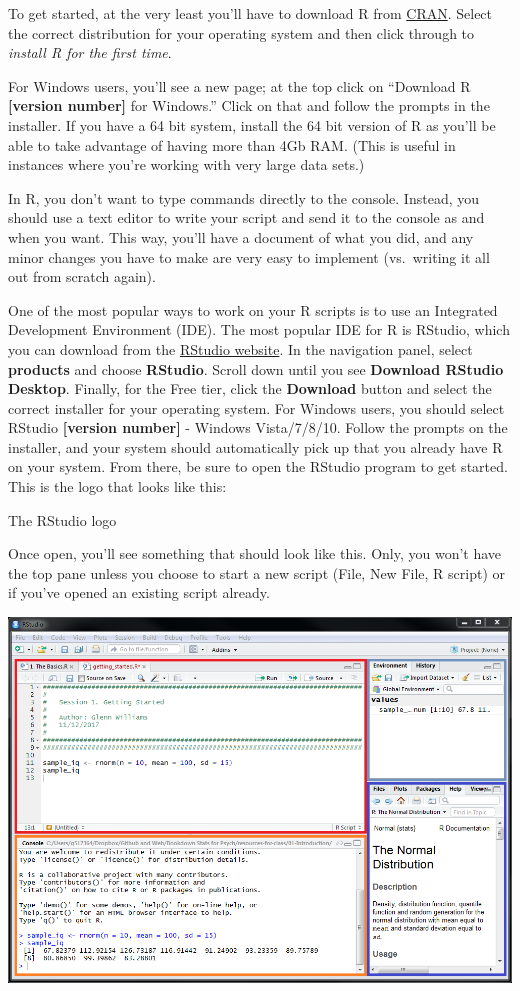 \documentclass[
]{book}
\begin{document}
To get started, at the very least you'll have to download R from \href{https://cran.r-project.org/}{CRAN}. Select the correct distribution for your operating system and then click through to \emph{install R for the first time}.

For Windows users, you'll see a new page; at the top click on ``Download R \textbf{{[}version number{]}} for Windows.'' Click on that and follow the prompts in the installer. If you have a 64 bit system, install the 64 bit version of R as you'll be able to take advantage of having more than 4Gb RAM. (This is useful in instances where you're working with very large data sets.)

In R, you don't want to type commands directly to the console. Instead, you should use a text editor to write your script and send it to the console as and when you want. This way, you'll have a document of what you did, and any minor changes you have to make are very easy to implement (vs.~writing it all out from scratch again).

One of the most popular ways to work on your R scripts is to use an Integrated Development Environment (IDE). The most popular IDE for R is RStudio, which you can download from the \href{https://www.rstudio.com/}{RStudio website}. In the navigation panel, select \textbf{products} and choose \textbf{RStudio}. Scroll down until you see \textbf{Download RStudio Desktop}. Finally, for the Free tier, click the \textbf{Download} button and select the correct installer for your operating system. For Windows users, you should select RStudio \textbf{{[}version number{]}} - Windows Vista/7/8/10. Follow the prompts on the installer, and your system should automatically pick up that you already have R on your system. From there, be sure to open the RStudio program to get started. This is the logo that looks like this:

The RStudio logo

Once open, you'll see something that should look like this. Only, you won't have the top pane unless you choose to start a new script (File, New File, R script) or if you've opened an existing script already.

\begin{center}\includegraphics[width=13.86in]{img/r_studio} \end{center}
\end{document}
